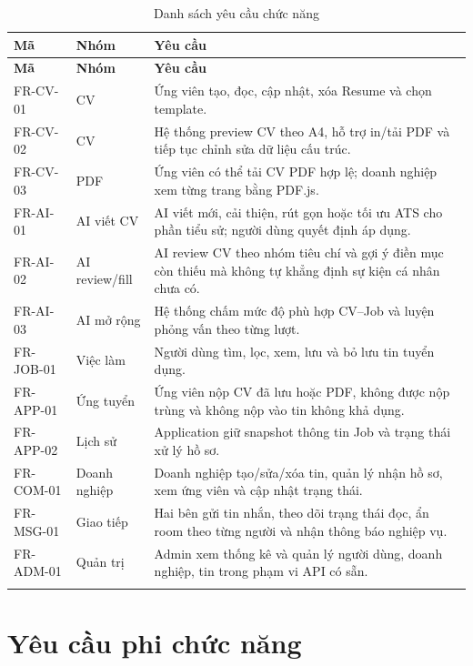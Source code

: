 \begin{longtable}{|p{}|p{}|p{}|}
    \hline
    \textbf{Mã} & \textbf{Nhóm} & \textbf{Yêu cầu} \\ \hline
    \endfirsthead
    \hline
    \textbf{Mã} & \textbf{Nhóm} & \textbf{Yêu cầu} \\ \hline
    \endhead
    FR-CV-01 & CV & Ứng viên tạo, đọc, cập nhật, xóa Resume và chọn template. \\ \hline
    FR-CV-02 & CV & Hệ thống preview CV theo A4, hỗ trợ in/tải PDF và tiếp tục chỉnh sửa dữ liệu cấu trúc. \\ \hline
    FR-CV-03 & PDF & Ứng viên có thể tải CV PDF hợp lệ; doanh nghiệp xem từng trang bằng PDF.js. \\ \hline
    FR-AI-01 & AI viết CV & AI viết mới, cải thiện, rút gọn hoặc tối ưu ATS cho phần tiểu sử; người dùng quyết định áp dụng. \\ \hline
    FR-AI-02 & AI review/fill & AI review CV theo nhóm tiêu chí và gợi ý điền mục còn thiếu mà không tự khẳng định sự kiện cá nhân chưa có. \\ \hline
    FR-AI-03 & AI mở rộng & Hệ thống chấm mức độ phù hợp CV--Job và luyện phỏng vấn theo từng lượt. \\ \hline
    FR-JOB-01 & Việc làm & Người dùng tìm, lọc, xem, lưu và bỏ lưu tin tuyển dụng. \\ \hline
    FR-APP-01 & Ứng tuyển & Ứng viên nộp CV đã lưu hoặc PDF, không được nộp trùng và không nộp vào tin không khả dụng. \\ \hline
    FR-APP-02 & Lịch sử & Application giữ snapshot thông tin Job và trạng thái xử lý hồ sơ. \\ \hline
    FR-COM-01 & Doanh nghiệp & Doanh nghiệp tạo/sửa/xóa tin, quản lý nhận hồ sơ, xem ứng viên và cập nhật trạng thái. \\ \hline
    FR-MSG-01 & Giao tiếp & Hai bên gửi tin nhắn, theo dõi trạng thái đọc, ẩn room theo từng người và nhận thông báo nghiệp vụ. \\ \hline
    FR-ADM-01 & Quản trị & Admin xem thống kê và quản lý người dùng, doanh nghiệp, tin trong phạm vi API có sẵn. \\ \hline
\caption{Danh sách yêu cầu chức năng}
\label{tab:functional-requirements}
\end{longtable}

\section{Yêu cầu phi chức năng}

